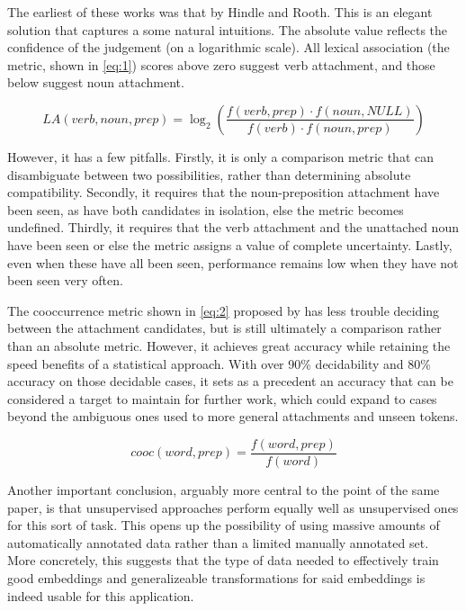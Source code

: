 \documentclass[a4paper, 12pt]{article}
\begin{document}
The earliest of these works was that by Hindle and Rooth. This is an elegant solution that captures a some natural intuitions. The absolute value reflects the confidence of the judgement (on a logarithmic scale). All lexical association (the metric, shown in \ref{eq:1}) scores above zero suggest verb attachment, and those below suggest noun attachment.

\begin{equation} \label{eq:1}
	LA(verb, noun, prep) = \log_{2} \left( \frac{f(verb, prep) \cdot f(noun, NULL)}{f(verb) \cdot f(noun, prep)} \right)
\end{equation}

However, it has a few pitfalls. Firstly, it is only a comparison metric that can disambiguate between two possibilities, rather than determining absolute compatibility. Secondly, it requires that the noun-preposition attachment have been seen, as have both candidates in isolation, else the metric becomes undefined. Thirdly, it requires that the verb attachment and the unattached noun have been seen or else the metric assigns a value of complete uncertainty. Lastly, even when these have all been seen, performance remains low when they have not been seen very often.

The cooccurrence metric shown in \ref{eq:2} proposed by \cite{Volk} has less trouble deciding between the attachment candidates, but is still ultimately a comparison rather than an absolute metric. However, it achieves great accuracy while retaining the speed benefits of a statistical approach. With over 90\% decidability and 80\% accuracy on those decidable cases, it sets as a precedent an accuracy that can be considered a target to maintain for further work, which could expand to cases beyond the ambiguous ones used to more general attachments and unseen tokens.

\begin{equation} \label{eq:2}
	cooc(word, prep) = \frac{f(word, prep)}{f(word)}
\end{equation}

Another important conclusion, arguably more central to the point of the same paper, is that unsupervised approaches perform equally well as unsupervised ones for this sort of task. This opens up the possibility of using massive amounts of automatically annotated data rather than a limited manually annotated set. More concretely, this suggests that the type of data needed to effectively train good embeddings and generalizeable transformations for said embeddings is indeed usable for this application.
\end{document}
